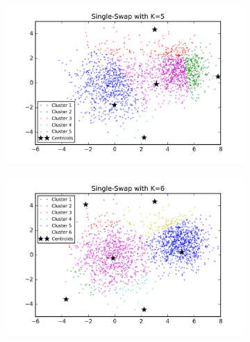 \begin{description}
\begin{description}
\begin{figure}[!h]
\begin{subfigure}[b]{0.475\textwidth}
        \end{subfigure}
        \begin{subfigure}[b]{0.475\textwidth}  
            \centering 
            \includegraphics[width=\textwidth]{./figures/clustering_singleSwap_5.png}
        \end{subfigure}
        \hfill
        \begin{subfigure}[b]{0.475\textwidth}   
            \centering 
            \includegraphics[width=\textwidth]{./figures/clustering_singleSwap_6.png}
        \end{subfigure}
        \begin{subfigure}[b]{0.475\textwidth}   
            \centering 

\end{subfigure}
\end{figure}
\end{description}
\end{description}
